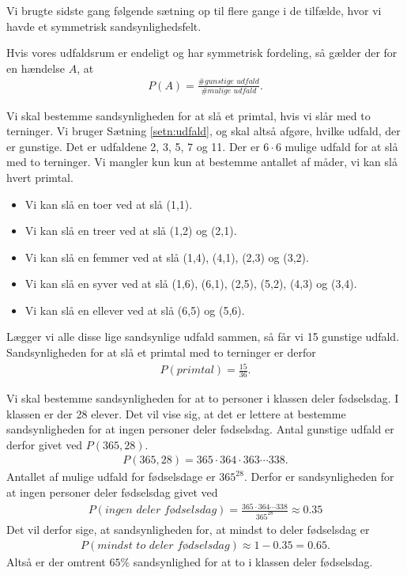 Vi brugte sidste gang følgende sætning op til flere gange i de tilfælde, hvor vi havde et symmetrisk sandsynlighedsfelt.
\begin{setn}\label{setn:udfald}
Hvis vores udfaldsrum er endeligt og har symmetrisk fordeling, så gælder der for en hændelse $A$, at
\begin{align*}
P(A) = \frac{\# \textit{gunstige udfald}}{\#  \textit{mulige udfald}}.
\end{align*}
\end{setn}
\begin{exa}
Vi skal bestemme sandsynligheden for at slå et primtal, hvis vi slår med to terninger.
Vi bruger Sætning \ref{setn:udfald}, og skal altså afgøre, hvilke udfald, der er gunstige. Det er udfaldene 2, 3, 5, 7 og 11. Der er $6\cdot 6$ mulige udfald for at slå med to terninger. Vi mangler kun kun at bestemme antallet af måder, vi kan slå hvert primtal. 
\begin{itemize}
\item Vi kan slå en toer ved at slå (1,1).
\item Vi kan slå en treer ved at slå (1,2) og (2,1).
\item Vi kan slå en femmer ved at slå (1,4), (4,1), (2,3) og (3,2).
\item Vi kan slå en syver ved at slå (1,6), (6,1), (2,5), (5,2), (4,3) og (3,4).
\item Vi kan slå en ellever ved at slå (6,5) og (5,6).
\end{itemize}
Lægger vi alle disse lige sandsynlige udfald sammen, så får vi 15 gunstige udfald. Sandsynligheden for at slå et primtal med to terninger er derfor 
\begin{align*}
P(\textit{primtal}) = \frac{15}{36}.
\end{align*}
\end{exa}
\begin{exa}

Vi skal bestemme sandsynligheden for at to personer i klassen deler fødselsdag. I klassen er der 28 elever. Det vil vise sig, at det er lettere at bestemme sandsynligheden for at ingen personer deler fødselsdag. Antal gunstige udfald er derfor givet ved $P(365,28)$.
\begin{align*}
P(365,28) = 365\cdot 364\cdot 363 \cdots 338.
\end{align*}
Antallet af mulige udfald for fødselsdage er $365^{28}$. Derfor er sandsynligheden for at ingen personer deler fødselsdag givet ved
\begin{align*}
P(\textit{ingen deler fødselsdag}) = \frac{365\cdot 364 \cdots 338}{365^{28}} \approx 0.35
\end{align*}
Det vil derfor sige, at sandsynligheden for, at mindst to deler fødselsdag er 
\begin{align*}
P(\textit{mindst to deler fødselsdag}) \approx 1-0.35 = 0.65.
\end{align*}
Altså er der omtrent $65\%$ sandsynlighed for at to i klassen deler fødselsdag. 
\end{exa}

